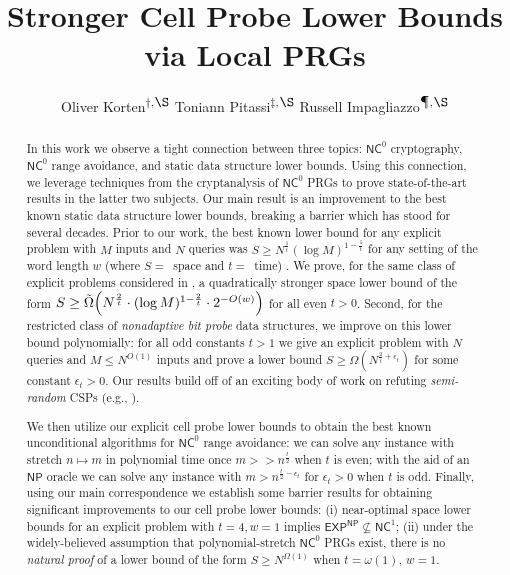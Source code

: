 \documentclass[11pt]{article}
\author{
Oliver Korten\textsuperscript{$\dagger$,$\S$} \qquad
Toniann Pitassi\textsuperscript{$\ddagger$,$\S$} \qquad
Russell Impagliazzo\textsuperscript{$\mathparagraph$,$\S$}
}
\date{}
\title{Stronger Cell Probe Lower Bounds via Local PRGs}
\begin{document}
\renewcommand{\thefootnote}{\fnsymbol{footnote}}

\maketitle
\renewcommand{\thefootnote}{\arabic{footnote}}
\setcounter{footnote}{0}

\begin{abstract}
In this work we observe a tight connection between three topics: $\mathsf{NC}^0$ cryptography, $\mathsf{NC}^0$ range avoidance, and static data structure lower bounds. Using this connection, we
leverage techniques from the cryptanalysis of $\mathsf{NC}^0$ PRGs to prove state-of-the-art results in the latter two subjects. Our main result is an improvement to the best known static data structure lower bounds, breaking a barrier which has stood for several decades.
Prior to our work, the best known lower bound for any explicit problem with $M$ inputs and $N$ queries was ${S \geq N^{\frac{1}{t}} (\log M)^{1-\frac{1}{t}}}$ for any setting of the word length $w$ (where $S=$~space and $t=$~time) \cite{Siegel89}. We prove, for the same class of explicit problems considered in \cite{Siegel89}, a quadratically stronger space lower bound of the form $S \geq \tilde{\Omega}\Bigl( N^{\frac{2}{t}} \cdot (\log M)^{1-\frac{2}{t}} \cdot 2^{-O(w)} \Bigr)$ for all even $t>0$. Second, for the restricted class of \emph{nonadaptive bit probe} data structures, we improve on this lower bound polynomially: for all odd constants $t>1$ we give an explicit problem with $N$ queries and $M \leq N^{O(1)}$ inputs and prove a lower bound $S \geq \Omega(N^{\frac{2}{t} + \epsilon_t})$ for some constant $\epsilon_t > 0$. Our results build off of an exciting body of work on refuting \emph{semi-random} CSPs (e.g., \cite{semirandom,smoothed,simpler-moore}).

We then utilize our explicit cell probe lower bounds to obtain the best known unconditional algorithms for $\mathsf{NC}^0$ range avoidance: we can solve any instance with stretch $n \mapsto m$ in polynomial time once $m >> n^{\frac{t}{2}}$ when $t$ is even; with the aid of an $\mathsf{NP}$ oracle we can solve any instance with $m > n^{\frac{t}{2} - \epsilon_t}$ for $\epsilon_t>0$ when $t$ is odd. Finally, using our main correspondence we establish some barrier results for obtaining significant improvements to our cell probe lower bounds: (i) near-optimal space lower bounds for an explicit problem with $t=4, w=1$ implies 
$\mathsf{EXP^{NP}} \not\subseteq \mathsf{NC}^1$; (ii) under the widely-believed assumption that polynomial-stretch $\mathsf{NC}^0$ PRGs exist, there is no \emph{natural proof} of a lower bound of the form $S \geq N^{\Omega(1)}$ when $t = \omega(1)$, $w=1$.

\end{abstract}
\newpage
\end{document}
